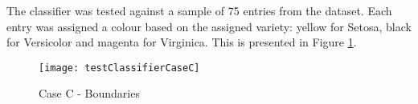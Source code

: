 The classifier was tested against a sample of 75 entries from the dataset. Each entry was assigned a colour based on the assigned variety:
yellow for Setosa, black for Versicolor and magenta for Virginica.
This is presented in Figure \ref{fig: classifier case C}.

\begin{figure}[htb!]
\centering
 \texttt{[image: testClassifierCaseC]}
 \caption{Case C - Boundaries}
 \label{fig: classifier case C}
\end{figure}

\pagebreak
\newpage
